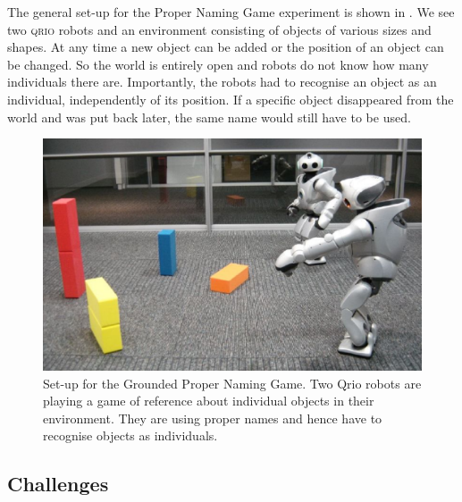 The general set-up for the Proper Naming Game experiment
is shown in . We see two \textsc{qrio} robots and an environment consisting of objects of various 
sizes and shapes. At any time a new object can be added or the position of an object can be changed. So the world is 
entirely open and robots do not know how many individuals there are. 
Importantly, the robots had to recognise an object as an individual, independently of its position. If 
a specific object disappeared from the world and was put back later, the same name would still have to be used.

\begin{figure}[htbp]
  \centerline{\includegraphics[width=.80\textwidth]{chap11/figs/grounded-naming-game.pdf}}
\caption{\label{fig:grounded}Set-up for the Grounded Proper Naming Game. Two Qrio robots are playing a game of reference about individual objects 
in their environment. They are using proper names and hence have to recognise objects as individuals.}
\end{figure}

\subsection{Challenges}

